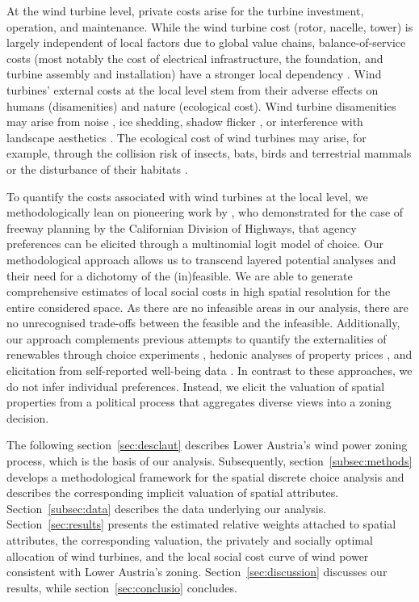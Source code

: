 \documentclass[review, a4paper, 12pt, authoryear, times]{elsarticle}
\begin{document}
At the wind turbine level, private costs arise for the turbine investment, operation, and maintenance.
While the wind turbine cost (rotor, nacelle, tower) is largely independent of local factors due to global value chains, balance-of-service costs (most notably the cost of electrical infrastructure, the foundation, and turbine assembly and installation) have a stronger local dependency \citep{Eberle2019, Stehly2022}. 
Wind turbines' external costs at the local level stem from their adverse effects on humans (disamenities) and nature (ecological cost).
Wind turbine disamenities may arise from noise \citep{Radun2022}, ice shedding, shadow flicker \citep{Haac2022}, or interference with landscape aesthetics \citep{Meyerhoff2010}. 
The ecological cost of wind turbines may arise, for example, through the collision risk of insects, bats, birds and terrestrial mammals \citep{Thaxter2017} or the disturbance of their habitats \citep{Coppes2020a}.

To quantify the costs associated with wind turbines at the local level, we methodologically lean on pioneering work by \citet{mcfadden_revealed_1975, mcfadden_revealed_1976}, who demonstrated for the case of freeway planning by the Californian Division of Highways, that agency preferences can be elicited through a multinomial logit model of choice.
Our methodological approach allows us to transcend layered potential analyses and their need for a dichotomy of the (in)feasible. 
We are able to generate comprehensive estimates of local social costs in high spatial resolution for the entire considered space.
As there are no infeasible areas in our analysis, there are no unrecognised trade-offs between the feasible and the infeasible.
Additionally, our approach complements previous attempts to quantify the externalities of renewables through choice experiments \citep[e.g.][]{AlvarezFarizo2002, Drechsler2011}, hedonic analyses of property prices \citep[e.g.][]{Hoen2011, Droees2021, Gaur2023}, and elicitation from self-reported well-being data \citep{Krekel2017}.
In contrast to these approaches, we do not infer individual preferences. 
Instead, we elicit the valuation of spatial properties from a political process that aggregates diverse views into a zoning decision.

The following section~\ref{sec:desclaut} describes Lower Austria's wind power zoning process, which is the basis of our analysis.
Subsequently, section~\ref{subsec:methods} develops a methodological framework for the spatial discrete choice analysis and describes the corresponding implicit valuation of spatial attributes.
Section~\ref{subsec:data} describes the data underlying our analysis.
Section~\ref{sec:results} presents the estimated relative weights attached to spatial attributes, the corresponding valuation, the privately and socially optimal allocation of wind turbines, and the local social cost curve of wind power consistent with Lower Austria's zoning.
Section~\ref{sec:discussion} discusses our results, while section~\ref{sec:conclusio} concludes.
\end{document}
